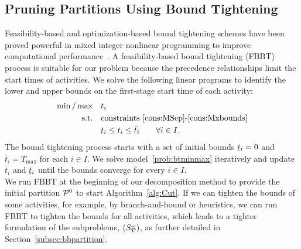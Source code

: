 \documentclass[11pt]{article}
\newcommand{\cP}{{\cal P}}
\renewcommand{\underbar}{\underaccent{\bar}}
\begin{document}
	\subsection{Pruning Partitions Using Bound Tightening} \label{subsec:FBBT}
	Feasibility-based and optimization-based bound tightening schemes have been proved powerful in mixed integer nonlinear programming to improve computational performance~\citep[e.g.,][]{belotti2012fbbt,coffrin2015strengthening,sundar2018OBBT}. A feasibility-based bound tightening (FBBT) process is suitable for our problem because the precedence relationships limit the start times of  activities. We solve the following linear programs to identify the lower and upper bounds on the first-stage start time of each activity: 
	\begin{subequations} \label{prob:btminmax}
		\begin{align}
		\min/\max \quad & t_i \\
		\text{s.t.} \quad & \text{constraints \eqref{cons:MSep}-\eqref{cons:Mxbounds}}\\
		& \underbar{t}_i \leq t_i \leq \bar{t}_i \qquad \forall i \in I.
		\end{align}
	\end{subequations}
	The bound tightening process starts with a set of initial bounds \(\underbar{t}_i = 0\) and \(\bar{t}_i = T_{\max}\) for each \(i \in I\). We solve model~\eqref{prob:btminmax} iteratively and update \(\bar{t}_i\) and \(\underbar{t}_i\) until the bounds converge for every \(i \in I\).\\
	\newline
	We run FBBT at the beginning of our decomposition method to provide the initial partition \(\cP^0\) to start Algorithm~\ref{alg:Cut}. If we can tighten the bounds of some activities, for example, by branch-and-bound or heuristics, we can run FBBT to tighten the bounds for all activities, which leads to a tighter formulation of the subproblems, \((S^{\omega}_{\cP})\), as further detailed in Section~\ref{subsec:bbpartition}.
	
\end{document}
